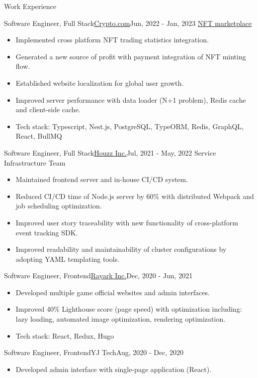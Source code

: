 \documentclass[]{mcdowellcv}
\begin{document}
	\begin{cvsection}{Work Experience}
		\begin{cvsubsection}{Software Engineer, Full Stack}{\href{https://crypto.com/}{Crypto.com}}{Jun, 2022 - Jan, 2023}
			\href{https://crypto.com/nft}{NFT marketplace}
			\begin{itemize}
				\item Implemented cross platform NFT trading statistics integration.
				\item Generated a new source of profit with payment integration of NFT minting flow.
				\item Established website localization for global user growth.
				\item Improved server performance with data loader (N+1 problem), Redis cache and client-side cache.
				\item Tech stack: Typescript, Nest.js, PostgreSQL, TypeORM, Redis, GraphQL, React, BullMQ
			\end{itemize}
		\end{cvsubsection}
		
		\begin{cvsubsection}{Software Engineer, Full Stack}{\href{https://www.houzz.com/}{Houzz Inc.}}{Jul, 2021 - May, 2022}	
			Service Infrastructure Team
			\begin{itemize}
				\item Maintained frontend server and in-house CI/CD system.
				\item Reduced CI/CD time of Node.js server by 60\% with distributed Webpack and job scheduling optimization.
				\item Improved user story traceability with new functionality of cross-platform event tracking SDK.
				\item Improved readability and maintainability of cluster configurations by adopting YAML templating tools.
			\end{itemize}
		\end{cvsubsection}
		
		\begin{cvsubsection}{Software Engineer, Frontend}{\href{https://rayark.com/}{Rayark Inc.}}{Dec, 2020 - Jun, 2021}		
			\begin{itemize}
				\item Developed multiple game official websites and admin interfaces.
				\item Improved 40\% Lighthouse score (page speed) with optimization including: lazy loading, automated image optimization, rendering optimization.
				\item Tech stack: React, Redux, Hugo
			\end{itemize}
		\end{cvsubsection}
		
		\begin{cvsubsection}{Software Engineer, Frontend}{YJ Tech}{Aug, 2020 - Dec, 2020}
			\begin{itemize}
				\item Developed admin interface with single-page application (React).
			\end{itemize}
		\end{cvsubsection}
	\end{cvsection}
	
\end{document}
